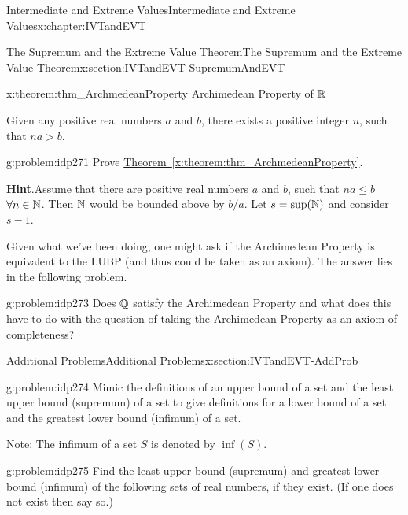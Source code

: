 \begin{chapterptx}{Intermediate and Extreme Values}{}{Intermediate and Extreme Values}{}{}{x:chapter:IVTandEVT}
\begin{sectionptx}{The Supremum and the Extreme Value Theorem}{}{The Supremum and the Extreme Value Theorem}{}{}{x:section:IVTandEVT-SupremumAndEVT}
		\begin{theorem}{}{}{x:theorem:thm_ArchmedeanProperty}%
			\alert{Archimedean Property of \(\mathbb {R}\)}%
			\par
			Given any positive real numbers \(a\) and \(b\), there exists a positive integer \(n\), such that \(na>b\).%
		\end{theorem}
		\begin{problem}{}{g:problem:idp271}%
			Prove \hyperref[x:theorem:thm_ArchmedeanProperty]{Theorem~{\xreffont\ref{x:theorem:thm_ArchmedeanProperty}}}.%
			\par\smallskip%
			\noindent\textbf{\blocktitlefont Hint}.\hypertarget{g:hint:idp272}{}\quad{}Assume that there are positive real numbers \(a\) and \(b\), such that \(na\le b\) \(\forall n\in \mathbb {N}\). Then \(\mathbb {N}\) would be bounded above by \(b/a\). Let \(s=\sup(\mathbb {N})\) and consider \(s-1\).%
		\end{problem}
		Given what we've been doing, one might ask if the Archimedean Property is equivalent to the LUBP (and thus could be taken as an axiom). The answer lies in the following problem.%
		\begin{problem}{}{g:problem:idp273}%
			  Does \(\mathbb {Q}\) satisfy the Archimedean Property and what does this have to do with the question of taking the Archimedean Property as an axiom of completeness?%
		\end{problem}
	\end{sectionptx}
	\typeout{************************************************}
	\typeout{************************************************}
	\begin{sectionptx}{Additional Problems}{}{Additional Problems}{}{}{x:section:IVTandEVT-AddProb}
		\begin{problem}{}{g:problem:idp274}%
			 Mimic the definitions of an upper bound of a set and the least upper bound (supremum) of a set to give definitions for a lower bound of a set and the greatest lower bound (infimum) of a set.%
			\par
			\alert{Note}: The infimum of a set \(S\) is denoted by \(\inf(S)\).%
		\end{problem}
		\begin{problem}{}{g:problem:idp275}%
			 Find the least upper bound (supremum) and greatest lower bound (infimum) of the following sets of real numbers, if they exist. (If one does not exist then say so.)%

\end{problem}
\end{sectionptx}
\end{chapterptx}

